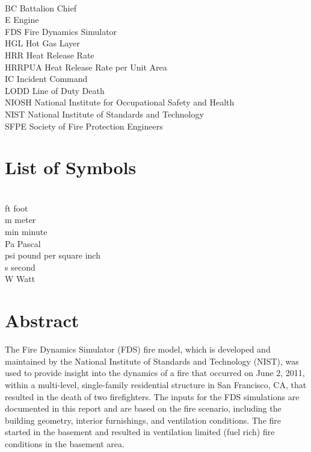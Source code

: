 \documentclass[12pt,oneside]{book}
\begin{document}
\begin{tabbing}
\hspace{1.5in} \= \\
BC \> Battalion Chief \\
E \> Engine \\
FDS \> Fire Dynamics Simulator \\
HGL \> Hot Gas Layer \\
HRR \> Heat Release Rate \\
HRRPUA \> Heat Release Rate per Unit Area \\
IC \> Incident Command \\
LODD \> Line of Duty Death \\
NIOSH \> National Institute for Occupational Safety and Health \\
NIST \> National Institute of Standards and Technology \\
SFPE \> Society of Fire Protection Engineers \\
\end{tabbing}

\chapter{List of Symbols}

\begin{tabbing}
\hspace{1.5in} \= \\
ft \> foot \\
m \> meter \\
min \> minute \\
Pa \> Pascal \\
psi \> pound per square inch \\
s \> second \\
W \> Watt \\
\end{tabbing}

\mainmatter


\chapter*{\centering Abstract}

The Fire Dynamics Simulator (FDS) fire model, which is developed and maintained by the National Institute of Standards and Technology (NIST), was used to provide insight into the dynamics of a fire that occurred on June 2, 2011, within a multi-level, single-family residential structure in San Francisco, CA, that resulted in the death of two firefighters. The inputs for the FDS simulations are documented in this report and are based on the fire scenario, including the building geometry, interior furnishings, and ventilation conditions. The fire started in the basement and resulted in ventilation limited (fuel rich) fire conditions in the basement area.
\end{document}
